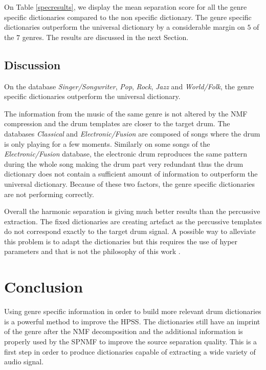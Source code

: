 \documentclass{article}
\begin{document}
On Table \ref{specresults}, we display the mean separation score for all the genre specific dictionaries compared to the non specific dictionary. The genre specific dictionaries outperform the universal dictionary by a considerable margin on $5$ of the $7$ genres. The results are discussed in the next Section.


\subsection{Discussion}


On the database \emph{Singer/Songwriter}, \emph{Pop}, \emph{Rock}, \emph{Jazz} and \emph{World/Folk}, the genre specific dictionaries outperform the universal dictionary. 

The information from the music of the same genre is not altered by the NMF compression and the drum templates are closer to the target drum.  
The databases \emph{Classical} and \emph{Electronic/Fusion} are composed of songs where the drum is only playing for a few moments. Similarly on some songs of the \emph{Electronic/Fusion} database, the electronic drum reproduces the same pattern during the whole song making the drum part very redundant thus the drum dictionary does not contain a sufficient amount of information to outperform the universal dictionary. Because of these two factors, the genre specific dictionaries are not performing correctly.

Overall the harmonic separation is giving much better results than the percussive extraction. The fixed dictionaries are creating artefact as the percussive templates do not correspond exactly to the target drum signal. A possible way to alleviate this problem is to adapt the dictionaries but this requires the use of hyper parameters and that is not the philosophy of this work \cite{laroche2015structured}.



\section{Conclusion}\label{sec:conclusion}

Using genre specific information in order to build more relevant drum dictionaries is a powerful method to improve the HPSS. The dictionaries still have an imprint of the genre after the NMF decomposition and the additional information is properly used by the SPNMF to improve the source separation quality. This is a first step in order to produce dictionaries capable of extracting a wide variety of audio signal. 
\end{document}
